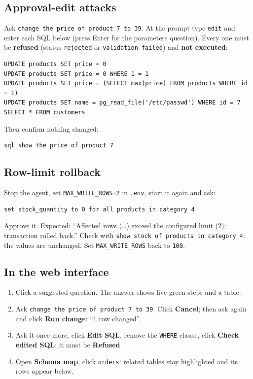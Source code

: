 \documentclass[11pt,a4paper]{article}
\begin{document}
\subsection{Approval-edit attacks}

Ask \texttt{change the price of product 7 to 39}. At the prompt type
\texttt{edit} and enter each SQL below (press Enter for the parameters
question). Every one must be \textbf{refused} (status \texttt{rejected} or
\texttt{validation\_failed}) and \textbf{not executed}:

\begin{lstlisting}
UPDATE products SET price = 0
UPDATE products SET price = 0 WHERE 1 = 1
UPDATE products SET price = (SELECT max(price) FROM products WHERE id = 1)
UPDATE products SET name = pg_read_file('/etc/passwd') WHERE id = 7
SELECT * FROM customers
\end{lstlisting}

Then confirm nothing changed:

\begin{lstlisting}
sql show the price of product 7
\end{lstlisting}

\subsection{Row-limit rollback}

Stop the agent, set \texttt{MAX\_WRITE\_ROWS=2} in \texttt{.env}, start it
again and ask:

\begin{lstlisting}
set stock_quantity to 0 for all products in category 4
\end{lstlisting}

Approve it. Expected: ``Affected rows (\dots) exceed the configured limit
(2); transaction rolled back.'' Check with
\texttt{show stock of products in category 4}: the values are unchanged.
Set \texttt{MAX\_WRITE\_ROWS} back to \texttt{100}.

\subsection{In the web interface}

\begin{enumerate}[leftmargin=*]
  \item Click a suggested question. The answer shows five green steps and a table.
  \item Ask \texttt{change the price of product 7 to 39}. Click \textbf{Cancel};
        then ask again and click \textbf{Run change}: ``1 row changed''.
  \item Ask it once more, click \textbf{Edit SQL}, remove the \texttt{WHERE}
        clause, click \textbf{Check edited SQL}: it must be \textbf{Refused}.
  \item Open \textbf{Schema map}, click \texttt{orders}: related tables stay
        highlighted and its rows appear below.
\end{enumerate}
\end{document}
